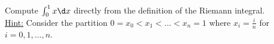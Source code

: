 \begin{problem}
  Compute $\int_0^1 x \d x$ directly from the definition of the Riemann integral.\\
  \underline{Hint:} Consider the partition $0 = x_0 < x_1 < \ldots < x_n = 1$
  where $x_i = \frac{i}{n}$ for $i = 0, 1, \ldots, n$.
\end{problem}

\begin{answer}

\end{answer}
